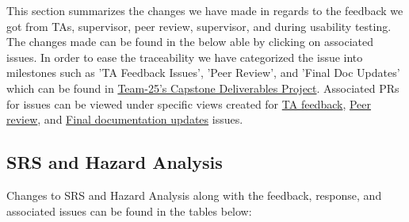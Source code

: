\documentclass{article}
\begin{document}


This section summarizes the changes we have made in regards to the feedback we got from TAs, supervisor, peer review, supervisor, and during usability testing. 
The changes made can be found in the below able by clicking on associated issues. 
In order to ease the traceability we have categorized the issue into milestones such as 'TA Feedback Issues', 'Peer Review', and 'Final Doc Updates' which can be found in \href{https://github.com/users/Inreet-Kaur/projects/2/views/1}{Team-25's Capstone Deliverables Project}. Associated PRs for issues can be viewed under specific views created for \href{https://github.com/users/Inreet-Kaur/projects/2/views/8?sliceBy%5Bvalue%5D=TA+Feedback+Issues}{TA feedback},  \href{https://github.com/users/Inreet-Kaur/projects/2/views/10?sliceBy%5Bvalue%5D=Peer+Review}{Peer review}, and \href{https://github.com/users/Inreet-Kaur/projects/2/views/9?sliceBy%5Bvalue%5D=Milestone+8+-+Final+Doc+Updates}{Final documentation updates} issues.

\subsection{SRS and Hazard Analysis}

Changes to SRS and Hazard Analysis along with the feedback, response, and associated issues can be found in the tables below: 
\end{document}
